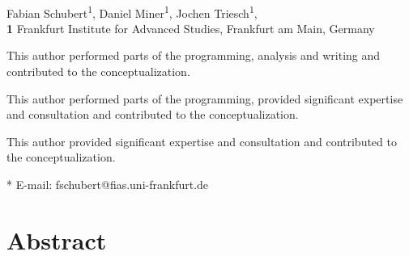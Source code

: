 \documentclass[10pt,letterpaper]{article}
\date{}
\begin{document}
\vspace*{0.2in}

\begin{flushleft}
{\Large
\textbf{} %
}
\newline
\\
Fabian Schubert\textsuperscript{1\Yinyang},
Daniel Miner\textsuperscript{1\ddag},
Jochen Triesch\textsuperscript{1\dag},
\\
\bigskip
\textbf{1} Frankfurt Institute for Advanced Studies, Frankfurt am Main, Germany
\\
\bigskip

% 
%
\Yinyang This author performed parts of the programming, analysis and writing and contributed to the conceptualization.

\ddag This author performed parts of the programming, provided significant expertise and consultation and contributed to the conceptualization.

\dag This author provided significant expertise and consultation and contributed to the conceptualization.

* E-mail: fschubert@fias.uni-frankfurt.de

\end{flushleft}
\section*{Abstract}
\end{document}
